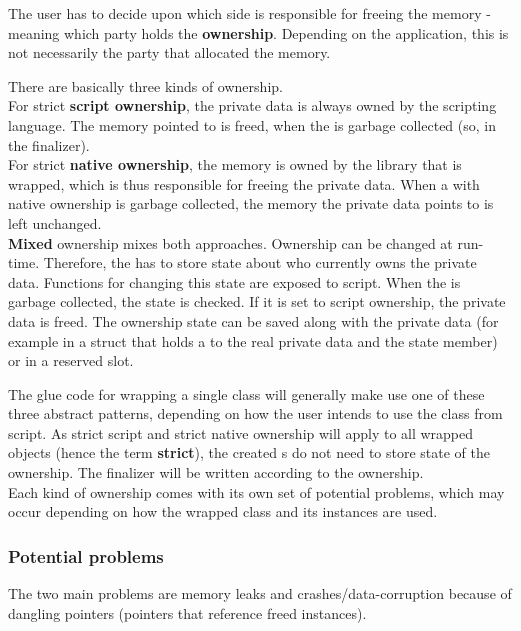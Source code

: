The  user has to decide upon which side is responsible for freeing the memory - meaning which party holds the \textbf{ownership}. Depending on the application, this is not necessarily the party that allocated the memory.

There are basically three kinds of ownership.\\
For strict \textbf{script ownership}, the private data is always owned by the scripting language. The memory pointed to is freed, when the  is garbage collected (so, in the finalizer).\\
For strict \textbf{native ownership}, the memory is owned by the  library that is wrapped, which is thus responsible for freeing the private data. When a  with native ownership is garbage collected, the memory the private data points to is left unchanged.\\
\textbf{Mixed} ownership mixes both approaches. Ownership can be changed at run-time. Therefore, the  has to store state about who currently owns the private data. Functions for changing this state are exposed to script. When the  is garbage collected, the state is checked. If it is set to script ownership, the private data is freed. The ownership state can be saved along with the private data (for example in a struct that holds a  to the real private data and the state member) or in a reserved slot.

The glue code for wrapping a single class will generally make use one of these three abstract patterns, depending on how the user intends to use the class from script. As strict script and strict native ownership will apply to all wrapped objects (hence the term \textbf{strict}), the created s do not need to store state of the ownership. The finalizer will be written according to the ownership.\\
Each kind of ownership comes with its own set of potential problems, which may occur depending on how the wrapped class and its instances are used.

\subsubsection{Potential problems}

The two main problems are memory leaks and crashes/data-corruption because of dangling pointers (pointers that reference freed instances).

